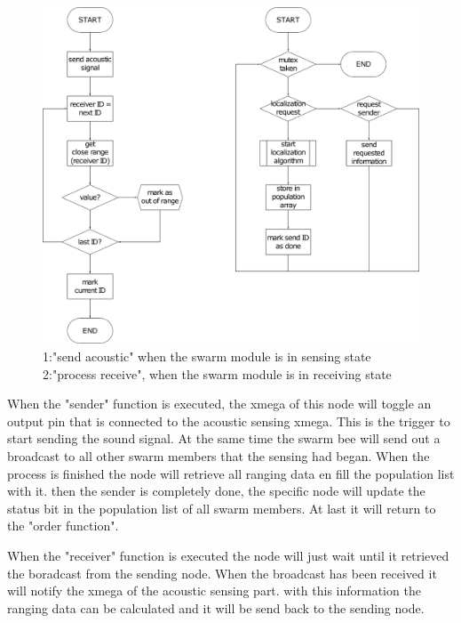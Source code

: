 \documentclass[10pt,a4paper]{article}
\begin{document}
\begin{figure}[H]
   \centering
   \includegraphics[width=\textwidth]{sendre.pdf}
   \caption{1:"send acoustic" when the swarm module is in sensing state 2:"process receive", when the swarm module is in receiving state}
   \label{fig:sendre}
\end{figure}

When the "sender" function is executed, the xmega of this node will toggle an output pin that is connected to the acoustic sensing xmega. This is the trigger to start sending the sound signal. At the same time the swarm bee will send out a broadcast to all other swarm members that the sensing had began. When the process is finished the node will retrieve all ranging data en fill the population list with it. then the sender is completely done, the specific node will update the status bit in the population list of all swarm members. At last it will return to the "order function".



When the "receiver" function is executed the node will just wait until it retrieved the boradcast from the sending node. When the broadcast has been received it will notify the xmega of the acoustic sensing part. with this information the ranging data can be calculated and it will be send back to the sending node.
\end{document}
